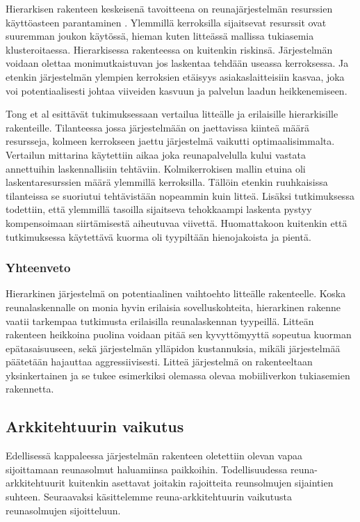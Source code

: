 Hierarkisen rakenteen keskeisenä tavoitteena on reunajärjestelmän resurssien käyttöasteen parantaminen \cite{tong2016hierarchical}. Ylemmillä kerroksilla sijaitsevat resurssit ovat suuremman joukon käytössä, hieman kuten litteässä mallissa tukiasemia klusteroitaessa. 
Hierarkisessa rakenteessa on kuitenkin riskinsä. Järjestelmän voidaan olettaa monimutkaistuvan jos laskentaa tehdään useassa kerroksessa. Ja etenkin järjestelmän ylempien kerroksien etäisyys asiakaslaitteisiin kasvaa, joka voi potentiaalisesti johtaa viiveiden kasvuun ja palvelun laadun heikkenemiseen.

Tong et al \cite{tong2016hierarchical} esittävät tukimuksessaan vertailua litteälle ja erilaisille hierarkisille rakenteille. Tilanteessa jossa järjestelmään on jaettavissa kiinteä määrä resursseja, kolmeen kerrokseen jaettu järjestelmä vaikutti optimaalisimmalta.
Vertailun mittarina käytettiin aikaa joka reunapalvelulla kului vastata annettuihin laskennallisiin tehtäviin. Kolmikerrokisen mallin etuina oli laskentaresurssien määrä ylemmillä kerroksilla. Tällöin etenkin ruuhkaisissa tilanteissa se suoriutui tehtävistään nopeammin kuin litteä. Lisäksi tutkimuksessa todettiin, että ylemmillä tasoilla sijaitseva tehokkaampi laskenta pystyy kompensoimaan siirtämisestä aiheutuvaa viivettä. Huomattakoon kuitenkin että tutkimuksessa käytettävä kuorma oli tyypiltään hienojakoista ja pientä. 


\subsubsection{Yhteenveto}
Hierarkinen järjestelmä on potentiaalinen vaihtoehto litteälle rakenteelle. Koska reunalaskennalle on monia hyvin erilaisia sovelluskohteita, hierarkinen rakenne vaatii tarkempaa tutkimusta erilaisilla reunalaskennan tyypeillä. Litteän rakenteen heikkoina puolina voidaan pitää sen kyvyttömyyttä sopeutua kuorman epätasaisuuseen, sekä järjestelmän ylläpidon kustannuksia, mikäli järjestelmää päätetään hajauttaa aggressiivisesti. Litteä järjestelmä on rakenteeltaan yksinkertainen ja se tukee esimerkiksi olemassa olevaa mobiiliverkon tukiasemien rakennetta. 


\subsection{Arkkitehtuurin vaikutus}
Edellisessä kappaleessa järjestelmän rakenteen oletettiin olevan vapaa sijoittamaan reunasolmut haluamiinsa paikkoihin. 
Todellisuudessa reuna-arkkitehtuurit kuitenkin asettavat joitakin rajoitteita reunsolmujen sijaintien suhteen. Seuraavaksi käsittelemme reuna-arkkitehtuurin vaikutusta reunasolmujen sijoitteluun.

